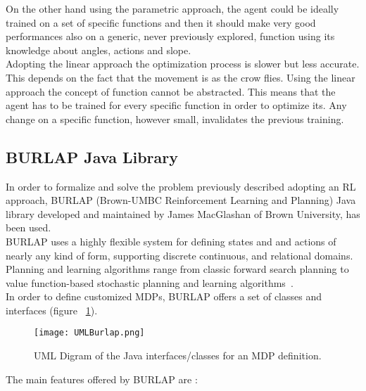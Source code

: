 On the other hand using the parametric approach, the agent could be ideally trained on a set of specific functions and then it should make very good performances also on a generic, never previously explored, function using its knowledge about angles, actions and slope. \\

Adopting the linear approach the optimization process is slower but less accurate. This depends on the fact that the movement is as the crow flies. Using the linear approach the concept of function cannot be abstracted. This means that the agent has to be trained for every specific function in order to optimize its. Any change on a specific function, however small, invalidates the previous training.

\subsection{BURLAP Java Library}

In order to formalize and solve the problem previously described adopting an RL approach, BURLAP (Brown-UMBC Reinforcement Learning and Planning) Java library developed and maintained by James MacGlashan of Brown University, has been used. \\

BURLAP uses a highly flexible system for defining states and and actions of nearly any kind of form, supporting discrete continuous, and relational domains. Planning and learning algorithms range from classic forward search planning to value function-based stochastic planning and learning algorithms~\cite{BURLAPSite}. \\

In order to define customized MDPs, BURLAP offers a set of classes and interfaces (figure ~\ref{fig:UMLBurlap}).

\begin{figure} [h!]
	\texttt{[image: UMLBurlap.png]}
	\caption{UML Digram of the Java interfaces/classes for an MDP definition.}
	\label{fig:UMLBurlap}
\end{figure}

The main features offered by BURLAP are :
	

